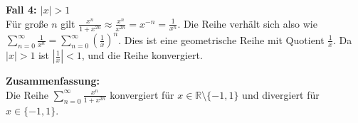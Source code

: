\documentclass{article}
\begin{document}
\begin{enumerate}[label=(\alph*)]
\textbf{Fall 4: $|x| > 1$}\\
Für große $n$ gilt $\frac{x^n}{1+x^{2n}} \approx \frac{x^n}{x^{2n}} = x^{-n} = \frac{1}{x^n}$.
Die Reihe verhält sich also wie $\sum_{n=0}^\infty \frac{1}{x^n} = \sum_{n=0}^\infty \left(\frac{1}{x}\right)^n$.
Dies ist eine geometrische Reihe mit Quotient $\frac{1}{x}$. Da $|x| > 1$ ist $\left|\frac{1}{x}\right| < 1$, und die Reihe konvergiert.

\textbf{Zusammenfassung:}\\
Die Reihe $\sum_{n=0}^\infty \frac{x^n}{1+x^{2n}}$ konvergiert für $x \in \mathbb{R} \setminus \{-1, 1\}$ und divergiert für $x \in \{-1, 1\}$.

\end{enumerate}
\end{document}
